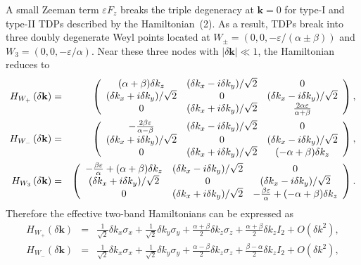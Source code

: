 \documentclass[aps,prl,floatfix,twocolumn,reprint]{revtex4}
\begin{document}
A small Zeeman term $\varepsilon F_{z}$ breaks the triple degeneracy at $%
\bm{k}=0$ for type-I and type-II TDPs described by the Hamiltonian~(2). As a
result, TDPs break into three doubly degenerate Weyl points located at $%
W_{\pm }=(0,0,-\varepsilon /(\alpha \pm \beta ))$ and $W_{3}=(0,0,-%
\varepsilon /\alpha )$. Near these three nodes with $|\delta \mathbf{k}|\ll 1
$, the Hamiltonian reduces to
\begin{eqnarray}
H_{W_{+}}\left( \delta \mathbf{k}\right)  &=&\left( {%
\begin{array}{ccc}
(\alpha +\beta )\delta k_{z} & (\delta k_{x}-i\delta k_{y})/\sqrt{2} & 0 \\
(\delta k_{x}+i\delta k_{y})/\sqrt{2} & 0 & (\delta k_{x}-i\delta k_{y})/\sqrt{2} \\
0 & (\delta k_{x}+i\delta k_{y})/\sqrt{2} &   \frac{2\alpha
\varepsilon }{\alpha +\beta }%
\end{array}%
}\right) , \\
H_{W_{-}}\left( \delta \mathbf{k}\right)  &=&~\left( {%
\begin{array}{ccc}
-\frac{2\beta \varepsilon }{\alpha -\beta } & (\delta k_{x}-i\delta k_{y})/\sqrt{2} & 0
\\
(\delta k_{x}+i\delta k_{y})/\sqrt{2} & 0 & (\delta k_{x}-i\delta k_{y})/\sqrt{2} \\
0 & (\delta k_{x}+i\delta k_{y})/\sqrt{2} & (-\alpha +\beta )\delta k_{z}%
\end{array}%
}\right) , \\
H_{W_{3}}\left( \delta \mathbf{k}\right)  &=&\left( {%
\begin{array}{ccc}
-\frac{\beta \varepsilon }{\alpha }+(\alpha +\beta )\delta k_{z} & (\delta
k_{x}-i\delta k_{y})/\sqrt{2} & 0 \\
(\delta k_{x}+i\delta k_{y})/\sqrt{2} & 0 & (\delta k_{x}-i\delta k_{y})/\sqrt{2} \\
0 & (\delta k_{x}+i\delta k_{y})/\sqrt{2} & -\frac{\beta \varepsilon }{\alpha }%
+(-\alpha +\beta )\delta k_{z}%
\end{array}%
}\right) .
\end{eqnarray}%
Therefore the effective two-band Hamiltonians can be expressed as
\begin{eqnarray}
H_{W_{+}}(\delta \bm{k}) &=&\frac{1}{\sqrt{2}}\delta k_{x}\sigma _{x}+\frac{1%
}{\sqrt{2}}\delta k_{y}\sigma _{y}+\frac{\alpha +\beta }{2}\delta
k_{z}\sigma _{z}+\frac{\alpha +\beta }{2}\delta k_{z}I_{2}+O(\delta k^{2}),
\\
H_{W_{-}}(\delta \bm{k}) &=&\frac{1}{\sqrt{2}}\delta k_{x}\sigma _{x}+\frac{1%
}{\sqrt{2}}\delta k_{y}\sigma _{y}+\frac{\alpha -\beta }{2}\delta
k_{z}\sigma _{z}+\frac{\beta -\alpha }{2}\delta k_{z}I_{2}+O(\delta k^{2}),
\end{eqnarray}%
\end{document}
